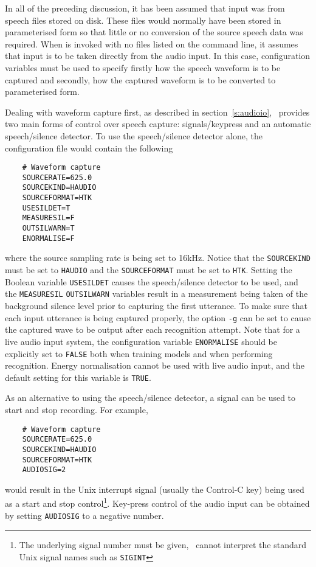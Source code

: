 
In all of the preceding discussion, it has been assumed that input was
from speech files stored on disk.  These files would normally have
been stored in parameterised form so that little or no conversion
of the source speech data was required.   When 
is invoked with no files listed on the command line, it assumes that
input is to be taken directly from the audio input.  In this case,
configuration variables must be used to specify firstly how the
speech waveform is to be captured and secondly, how the captured
waveform is to be converted to parameterised form. 

Dealing with waveform capture first, as described in
section~\ref{s:audioio}, \HTK\ provides two main forms of control over speech
capture: signals/keypress and an automatic speech/silence
detector. To use the speech/silence detector
alone, the configuration file would contain the following
\begin{verbatim}
    # Waveform capture
    SOURCERATE=625.0
    SOURCEKIND=HAUDIO
    SOURCEFORMAT=HTK
    USESILDET=T
    MEASURESIL=F
    OUTSILWARN=T
    ENORMALISE=F
\end{verbatim}

where the source sampling rate is being set to 16kHz.  Notice that the
\texttt{SOURCEKIND} must be set to
\texttt{HAUDIO} and the \texttt{SOURCEFORMAT} must be set to 
\texttt{HTK}. Setting the Boolean variable 
\texttt{USESILDET} causes the
speech/silence detector to be used, and the
\texttt{MEASURESIL}
\texttt{OUTSILWARN} 
variables result in a measurement being taken of the background silence level
prior to capturing the first utterance.  To make sure that each input utterance
is being captured properly, the  option \texttt{-g} can be set to
cause the captured wave to be output after each recognition attempt. Note that
for a live audio input system, the configuration variable
\texttt{ENORMALISE} should be explicitly set to \texttt{FALSE} both when training models and when performing recognition. Energy normalisation cannot
be used with live audio input, and the default setting for this variable
is \texttt{TRUE}.

As an alternative to using the speech/silence detector, a
signal can be used to start and stop
recording.  For example,
\begin{verbatim}
    # Waveform capture
    SOURCERATE=625.0
    SOURCEKIND=HAUDIO
    SOURCEFORMAT=HTK
    AUDIOSIG=2
\end{verbatim}
would result in the Unix interrupt signal (usually the Control-C key) being
used as a start and stop control\footnote{ The underlying signal number must be
given, \HTK\ cannot interpret the standard Unix signal names such as
\texttt{SIGINT} }. Key-press control of the audio input can be obtained by
setting \texttt{AUDIOSIG} to a negative number.

